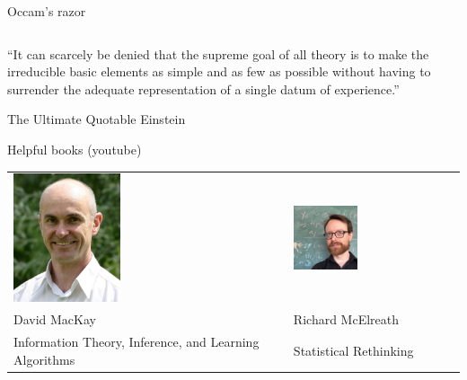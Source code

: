 \documentclass{beamer}
\begin{document}
\begin{frame}{Occam's razor}
\begin{columns}[T,onlytextwidth]
\end{columns}
\begin{block}{}
``It can scarcely be denied that the supreme goal of all theory is to
make the irreducible basic elements as simple and as few as possible without
having to surrender the adequate representation of a single datum of experience.''
\end{block}
\begin{block}
{\small The Ultimate Quotable Einstein}
\end{block}
\end{frame}

\begin{frame}{Helpful books (youtube)}{}
\begin{tabular}{ll}
\includegraphics[width=0.4\textwidth]{figures/david-j-c-mackay.jpeg} &
\includegraphics[width=0.4\textwidth]{figures/mcelreath.jpg} \\
David MacKay & Richard McElreath \\
{\tiny Information Theory, Inference, and Learning Algorithms} &
{\tiny Statistical Rethinking}
\end{tabular}{}
\end{frame}
\end{document}
